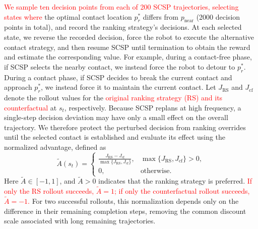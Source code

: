  \textcolor{red}{We sample ten decision points from each of 200 SCSP trajectories, selecting states where} the optimal contact location $p_r^*$ differs from $p_{\text{near}}$ (2000 decision points in total), and record the ranking strategy's decisions. At each selected state, we reverse the recorded decision, force the robot to execute the alternative contact strategy, and then resume SCSP until termination to obtain the reward and estimate the corresponding value. For example, during a contact-free phase, if SCSP selects the nearby contact, we instead force the robot to detour to $p_r^*$. During a contact phase, if SCSP decides to break the current contact and approach $p_r^*$, we instead force it to maintain the current contact. Let $J_{\mathrm{RS}}$ and $J_{\mathrm{cf}}$ denote the rollout values for the  \textcolor{red}{original ranking strategy (RS) and its counterfactual} at $s_t$, respectively. Because SCSP replans at high frequency, a single-step decision deviation may have only a small effect on the overall trajectory. We therefore protect the perturbed decision from ranking overrides until the selected contact is established and evaluate its effect using the normalized advantage, defined as
\begin{equation}
\widetilde{A}(s_t)=
\begin{cases}
\displaystyle\frac{J_{\mathrm{RS}}-J_{\mathrm{cf}}}
{\max\{J_{\mathrm{RS}},J_{\mathrm{cf}}\}},
& \max\{J_{\mathrm{RS}},J_{\mathrm{cf}}\}>0,\\[4pt]
0, & \text{otherwise}.
\end{cases}
\end{equation}
Here $\widetilde{A}\in[-1,1]$, and $\widetilde{A}>0$ indicates that the ranking strategy is preferred.  \textcolor{red}{If only the RS rollout succeeds, $\widetilde{A}=1$; if only the counterfactual rollout succeeds, $\widetilde{A}=-1$.} For two successful rollouts, this normalization depends only on the difference in their remaining completion steps, removing the common discount scale associated with long remaining trajectories.

